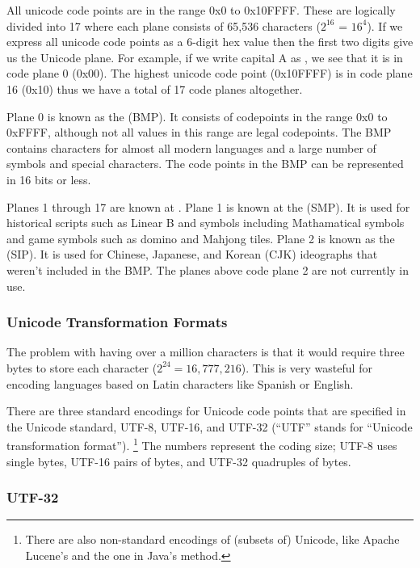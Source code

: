 All unicode code points are in the range 0x0 to 0x10FFFF.
These are logically divided into 17 
where each plane consists of 65,536 characters ($2^{16}$ = $16^4$).
If we express all unicode code points as a 6-digit hex value
then the first two digits give us the Unicode plane.
For example, if we write capital A as , we 
see that it is in code plane 0 (0x00).
The highest unicode code point (0x10FFFF) is in code plane 16 (0x10)
thus we have a total of 17 code planes altogether.

Plane 0 is known as the  (BMP).
It consists of codepoints in the range 0x0 to 0xFFFF, although not all
values in this range are legal codepoints.
The BMP contains characters for almost all modern languages
and a large number of symbols and special characters.
The code points in the BMP can be represented in 16 bits or less.

Planes 1 through 17 are known at .
Plane 1 is known at the  (SMP).
It is used for historical scripts such as Linear B and symbols including
Mathamatical symbols and game symbols such as domino and Mahjong tiles.
Plane 2 is known as the  (SIP).
It is used for Chinese, Japanese, and Korean (CJK) ideographs
that weren't included in the BMP.
The planes above code plane 2 are not currently in use.

\subsubsection{Unicode Transformation Formats}

The problem with having over a million characters is that it would
require three bytes to store each character ($2^{24} = 16,777,216$).
This is very wasteful for encoding languages based on Latin characters
like Spanish or English.

There are three standard encodings for Unicode code points that are
specified in the Unicode standard, UTF-8, UTF-16, and UTF-32 (``UTF''
stands for ``Unicode transformation format'').%
%
\footnote{There are also non-standard encodings of (subsets of) 
Unicode, like Apache Lucene's and the one in Java's
 method.}
%
The numbers represent the coding size; UTF-8 uses single bytes,
UTF-16 pairs of bytes, and UTF-32 quadruples of bytes.

\subsubsection{UTF-32}

